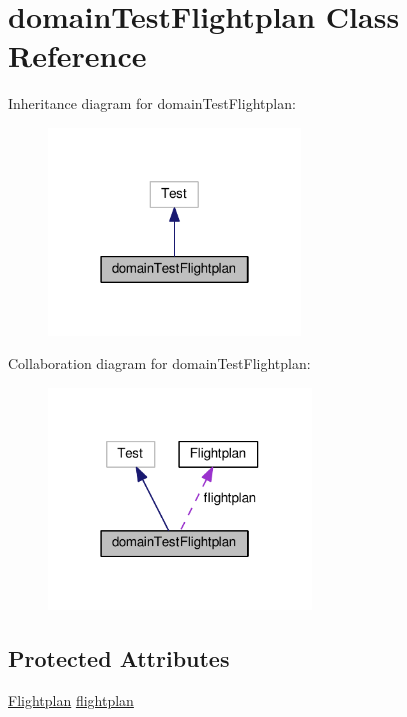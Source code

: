\hypertarget{classdomainTestFlightplan}{}\section{domain\+Test\+Flightplan Class Reference}
\label{classdomainTestFlightplan}


Inheritance diagram for domain\+Test\+Flightplan\+:
\nopagebreak
\begin{figure}[H]
\begin{center}
\leavevmode
\includegraphics[width=190pt]{classdomainTestFlightplan__inherit__graph}
\end{center}
\end{figure}


Collaboration diagram for domain\+Test\+Flightplan\+:
\nopagebreak
\begin{figure}[H]
\begin{center}
\leavevmode
\includegraphics[width=198pt]{classdomainTestFlightplan__coll__graph}
\end{center}
\end{figure}
\subsection*{Protected Attributes}
\begin{DoxyCompactItemize}
\item 
\hyperlink{classFlightplan}{Flightplan} \hyperlink{classdomainTestFlightplan_a5c1212bcf010e1a67e7f4524518e0ae3}{flightplan}
\end{DoxyCompactItemize}



